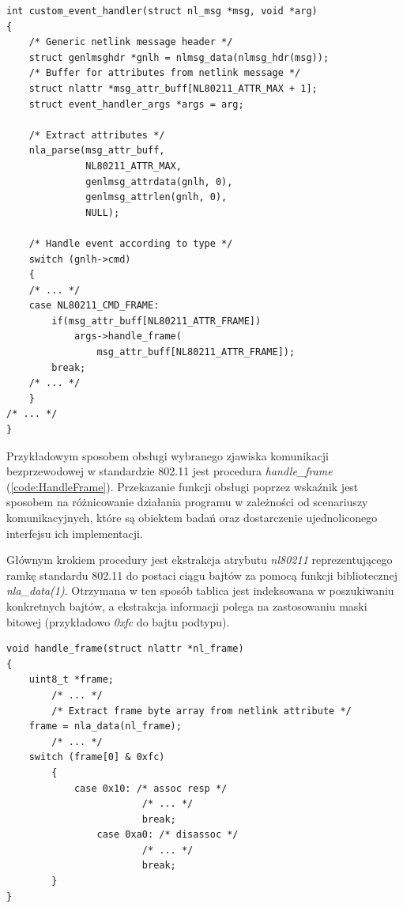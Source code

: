 \begin{lstlisting}[frame=tb]
int custom_event_handler(struct nl_msg *msg, void *arg)
{
    /* Generic netlink message header */
    struct genlmsghdr *gnlh = nlmsg_data(nlmsg_hdr(msg));
    /* Buffer for attributes from netlink message */
    struct nlattr *msg_attr_buff[NL80211_ATTR_MAX + 1];
    struct event_handler_args *args = arg;
        
    /* Extract attributes */
    nla_parse(msg_attr_buff, 
              NL80211_ATTR_MAX, 
              genlmsg_attrdata(gnlh, 0), 
              genlmsg_attrlen(gnlh, 0), 
              NULL);
        
    /* Handle event according to type */
    switch (gnlh->cmd) 
    {
    /* ... */
    case NL80211_CMD_FRAME:
        if(msg_attr_buff[NL80211_ATTR_FRAME])
            args->handle_frame(
                msg_attr_buff[NL80211_ATTR_FRAME]);
        break;
    /* ... */
    }
/* ... */
}
\end{lstlisting}

Przykładowym sposobem obsługi wybranego zjawiska komunikacji bezprzewodowej w standardzie 802.11 jest procedura \emph{handle\_frame} (\ref{code:HandleFrame}). Przekazanie funkcji obsługi poprzez wskaźnik jest sposobem na różnicowanie działania programu w zależności od scenariuszy komunikacyjnych, które są obiektem badań oraz dostarczenie ujednoliconego interfejsu ich implementacji. 

Głównym krokiem procedury jest ekstrakcja atrybutu \emph{nl80211} reprezentującego ramkę standardu 802.11 do postaci ciągu bajtów za pomocą funkcji bibliotecznej \emph{nla\_data(1)}. Otrzymana w ten sposób tablica jest indeksowana w poszukiwaniu konkretnych bajtów, a ekstrakcja informacji polega na zastosowaniu maski bitowej (przykładowo \emph{0xfc} do bajtu podtypu). 

\begin{lstlisting}[frame=tb]
void handle_frame(struct nlattr *nl_frame)
{
	uint8_t *frame;
        /* ... */
        /* Extract frame byte array from netlink attribute */
	frame = nla_data(nl_frame);
        /* ... */
	switch (frame[0] & 0xfc) 
        {
	        case 0x10: /* assoc resp */
                        /* ... */
                        break;
                case 0xa0: /* disassoc */
                        /* ... */
                        break;
        }
}
\end{lstlisting}

